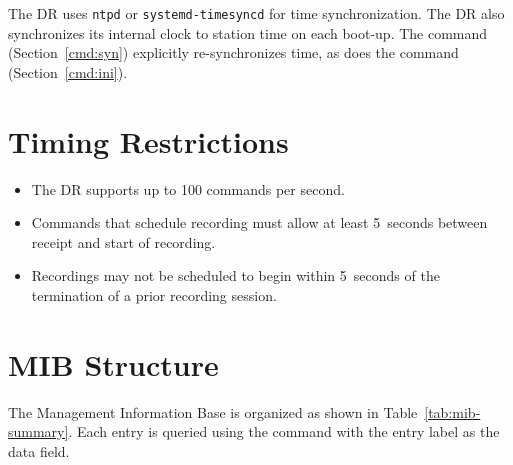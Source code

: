 The DR uses \texttt{ntpd} or \texttt{systemd-timesyncd} for time
synchronization.  The DR also synchronizes its internal clock to station time
on each boot-up.  The  command (Section~\ref{cmd:syn}) explicitly re-synchronizes time, as does the  command (Section~\ref{cmd:ini}).

\section{Timing Restrictions}

\begin{itemize}
    \item The DR supports up to 100 commands per second.
    \item Commands that schedule recording must allow at least 5~seconds between
          receipt and start of recording.
    \item Recordings may not be scheduled to begin within 5~seconds of the
          termination of a prior recording session.
\end{itemize}



\section{MIB Structure}
\label{sec:mib}

The Management Information Base is organized as shown in
Table~\ref{tab:mib-summary}.  Each entry is queried using the 
command with the entry label as the data field.

